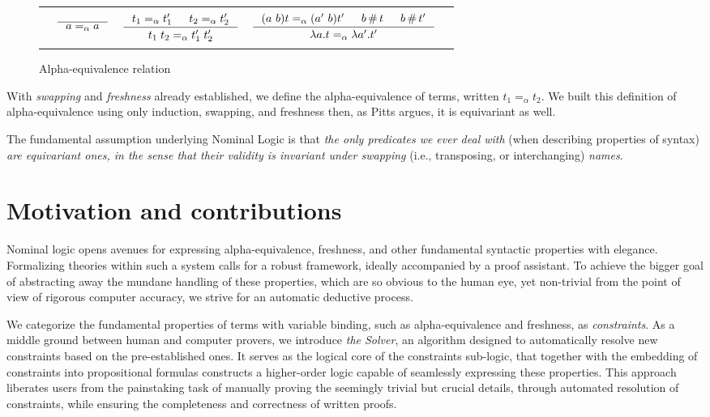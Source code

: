 \documentclass[english, mgr]{iithesis}
\renewcommand{\it}[1]{\textit{#1}}
\newcommand{\aequiv}{\ensuremath{=_\alpha}}
\begin{document}
\begin{figure}[htbp]
  \centering
    \begin{tabularx}{\textwidth}{|ccCcc|}
    \hline & & & & \\ {} &
    $
    \inference{
      \text{}
    }{
      a \aequiv a
    }
    $ & $
    \inference{
      t_1 \aequiv t_1' & t_2 \aequiv t_2'
    }{
      t_1\;t_2 \aequiv t_1'\;t_2'
    }
    $ & $
    \inference{
      \permswap{a}{b}{t} \aequiv \permswap{a'}{b}{t'} & b \cfresh t & b \cfresh t'
    }{
      \lambda a . t \aequiv \lambda a' . t'
    }
    $ & {} \\ & & & & \\ \hline
    \end{tabularx}
  \caption{Alpha-equivalence relation}
  \label{fig:fresh}
\end{figure}
With \it{swapping} and \it{freshness} already established,
we define the alpha-equivalence of terms, written $t_1 \aequiv t_2$.
We built this definition of alpha-equivalence using only induction,
swapping, and freshness then, as Pitts argues, it is equivariant as well.
\\
\begin{mdframed}[frametitle={\textnormal{\footnotesize \textbf{\citeauthor{nominal-logic}}, \textit{\citetitle{nominal-logic}}\cite{nominal-logic}:}}]
The fundamental assumption underlying Nominal Logic is that \textit{the only predicates we ever deal with} (when describing properties of syntax) \textit{are equivariant ones, in the sense that their validity is invariant under swapping} (i.e., transposing, or interchanging) \textit{names}.
\end{mdframed}

\section{Motivation and contributions}
Nominal logic opens avenues for expressing alpha-equivalence, freshness, and
other fundamental syntactic properties with elegance.
Formalizing theories within such a system calls for
a robust framework, ideally accompanied by a proof assistant.
To achieve the bigger goal of abstracting away the mundane handling of these
properties, which are so obvious to the human eye,
yet non-trivial from the point of view of rigorous computer accuracy,
we strive for an automatic deductive process.

We categorize the fundamental properties of terms with variable binding,
such as alpha-equivalence and freshness, as \it{constraints}.
As a middle ground between human and computer provers,
we introduce \it{the Solver}, an algorithm designed to automatically
resolve new constraints based on the pre-established ones.
It serves as the logical core of the constraints sub-logic,
that together with the embedding of constraints into propositional formulas
constructs a higher-order logic capable of seamlessly expressing these properties.
This approach liberates users from the painstaking task of manually proving the seemingly trivial but crucial details,
through automated resolution of constraints,
while ensuring the completeness and correctness of written proofs.
\end{document}
